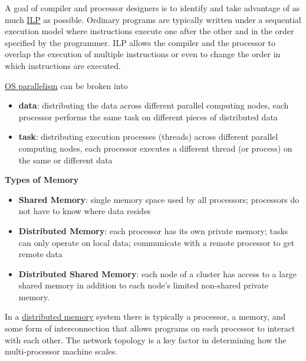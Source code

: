 \documentclass[12pt]{article}
\begin{document}
A goal of compiler and processor designers is to identify and take advantage of as much \underline{ILP} as possible. Ordinary programs are typically written under a sequential execution model where instructions execute one after the other and in the order specified by the programmer. ILP allows the compiler and the processor to overlap the execution of multiple instructions or even to change the order in which instructions are executed.

\underline{OS parallelism} can be broken into 
\begin{itemize}
\item \textbf{data}: distributing the data across different parallel computing nodes, each processor performs the same task on different pieces of distributed data
\item \textbf{task}: distributing execution processes (threads) across different parallel computing nodes, each processor executes a different thread (or process) on the same or different data
\end{itemize}


\vspace*{2em}
\noindent \textbf{Types of Memory}

\begin{itemize}
\item \textbf{Shared Memory}: single memory space used by all processors; processors do not have to know where data resides
\item \textbf{Distributed Memory}: each processor has its own private memory; tasks can only operate on local data; communicate with a remote processor to get remote data
\item \textbf{Distributed Shared Memory}: each node of a cluster has access to a large shared memory in addition to each node's limited non-shared private memory.
\end{itemize}

In a \underline{distributed memory} system there is typically a processor, a memory, and some form of interconnection that allows programs on each processor to interact with each other. %
The network topology is a key factor in determining how the multi-processor machine scales. %
\end{document}
